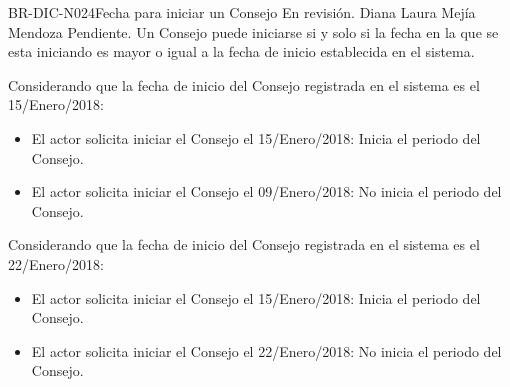\begin{BusinessRule}{BR-DIC-N024}{Fecha para iniciar un Consejo}
	{\bcAutorization} %
	{\btEnabler}     %
{\blControlling}     %
	\BRItem[Estado] En revisión.
	 Diana Laura Mejía Mendoza
	 Pendiente.
	\BRItem[Descripción] Un Consejo puede iniciarse si y solo si la fecha en la que se esta iniciando es mayor o igual a la fecha de inicio establecida en el sistema.
%	
%		
%		
	
	 Considerando que la fecha de inicio del Consejo registrada en el sistema es el 15/Enero/2018:
	\begin{itemize}
		\item El actor solicita iniciar el Consejo el 15/Enero/2018: Inicia el periodo del Consejo.
		\item El actor solicita iniciar el Consejo el 09/Enero/2018: No inicia el periodo del Consejo.
	\end{itemize} 
	
	 Considerando que la fecha de inicio del Consejo registrada en el sistema es el 22/Enero/2018:
	\begin{itemize}
		\item El actor solicita iniciar el Consejo el 15/Enero/2018: Inicia el periodo del Consejo.
		\item El actor solicita iniciar el Consejo el 22/Enero/2018: No inicia el periodo del Consejo.
	\end{itemize} 
	
\end{BusinessRule}

